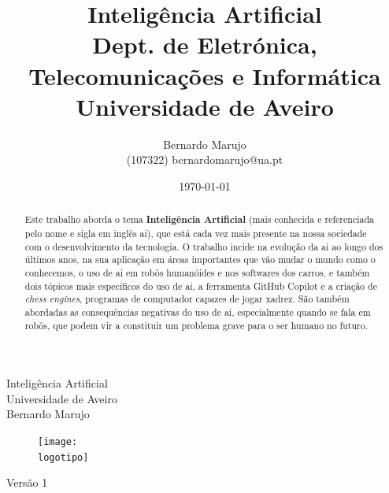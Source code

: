 \documentclass{report}
\begin{document}
%
\def\titulo{Inteligência Artificial}
\def\data{DATA}
\def\autores{Bernardo Marujo}
\def\autorescontactos{(107322) bernardomarujo@ua.pt}
\def\versao{Versão 1}
\def\departamento{Dept. de Eletrónica, Telecomunicações e Informática}
\def\empresa{Universidade de Aveiro}
\def\logotipo{ua.pdf}
%
%
\begin{titlepage}

\begin{center}
%
\vspace*{50mm}
%
{\Huge \titulo}\\ 
%
\vspace{10mm}
%
{\Large \empresa}\\
%
\vspace{10mm}
%
{\LARGE \autores}\\ 
%
\vspace{30mm}
%
\begin{figure}[h]
\center
\texttt{[image: \\logotipo]}
\end{figure}
%
\vspace{30mm}
\end{center}
%
\begin{flushright}
\versao
\end{flushright}
\end{titlepage}

\title{%
{\Huge\textbf{\titulo}}\\
{\Large \departamento\\ \empresa}
}
%
\author{%
    \autores \\
    \autorescontactos
}
%
\date{\today}
%
\maketitle

\begin{abstract}
Este trabalho aborda o tema \textbf{Inteligência Artificial} (mais conhecida e referenciada pelo nome e sigla em inglês \ac{ai}), que está cada vez mais presente na nossa sociedade com o desenvolvimento da tecnologia. O trabalho incide na evolução da \ac{ai} ao longo dos últimos anos, na sua aplicação em áreas importantes que vão mudar o mundo como o conhecemos, o uso de \ac{ai} em robôs humanóides e nos softwares dos carros, e também dois tópicos mais específicos do uso de \ac{ai}, a ferramenta GitHub Copilot e a criação de \textit{chess engines}, programas de computador capazes de jogar xadrez. São também abordadas as consequências negativas do uso de \ac{ai}, especialmente quando se fala em robôs, que podem vir a constituir um problema grave para o ser humano no futuro.
\end{abstract}
\end{document}
